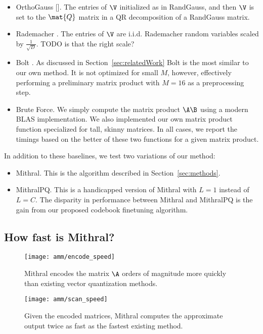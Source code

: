 \begin{itemize}
    \item OrthoGauss []. The entries of $\V$ initialized as in RandGauss, and then $\V$ is set to the $\mat{Q}$ matrix in a QR decomposition of a RandGauss matrix.
    \item Rademacher \cite{sparseJL}. The entries of $\V$ are i.i.d. Rademacher random variables scaled by $\frac{1}{\sqrt{D}}$. TODO is that the right scale?
    \item Bolt \cite{bolt}. As discussed in Section~\ref{sec:relatedWork} Bolt is the most similar to our own method. It is not optimized for small $M$, however, effectively performing a preliminary matrix product with $M=16$ as a preprocessing step.
    \item Brute Force. We simply compute the matrix product $\A\B$ using a modern BLAS implementation. We also implemented our own matrix product function specialized for tall, skinny matrices. In all cases, we report the timings based on the better of these two functions for a given matrix product.
\end{itemize}

In addition to these baselines, we test two variations of our method:
\begin{itemize}
    \item Mithral. This is the algorithm described in Section~\ref{sec:methods}.
    \item MithralPQ. This is a handicapped version of Mithral with $L=1$ instead of $L=C$. The disparity in performance between Mithral and MithralPQ is the gain from our proposed codebook finetuning algorithm.
\end{itemize}

\subsection{How fast is Mithral?}

\begin{figure}[h]
\begin{center}
\texttt{[image: amm/encode\_speed]}
\caption{Mithral encodes the matrix $\A$ orders of magnitude more quickly than existing vector quantization methods.}
\label{fig:cifar}
\end{center}
\end{figure}

\begin{figure}[h]
\begin{center}
\texttt{[image: amm/scan\_speed]}
\caption{Given the encoded matrices, Mithral computes the approximate output twice as fast as the fastest existing method.}
\label{fig:cifar}
\end{center}
\end{figure}

